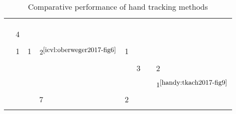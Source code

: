 {\begin{longtable}{| l | l | l | l | l | l | l | l |}
\hline & & & & & & & \\[-1.2em]
%
\cite{mueller2017real} & &	&	&	&	&	&	\\
\hline & & & & & & & \\[-1.2em]
%
\cite{neverova2017hand} & 4&	&	&	&	&	&	\\
\hline & & & & & & & \\[-1.2em]
%
\cite{oberweger2017deepprior++} & 1&	1&	$2^{\ref{icvl:oberweger2017-fig6}}$ &	1&	&	&	\\
\hline & & & & & & & \\[-1.2em]
%
\cite{taylor2017articulated} & &	&	&	&	3&	&	2\\
\hline & & & & & & & \\[-1.2em]
%
\cite{tkach2017online} & &	&	&	&	&	&	$1^{\ref{handy:tkach2017-fig9}}$\\
\hline & & & & & & & \\[-1.2em]
%
\cite{wan2017crossing} & &	&	7&	2&	&	&	\\
\hline

\caption{Comparative performance of hand tracking methods} %
\label{tab:methods_accuracy}
\end{longtable}
}
